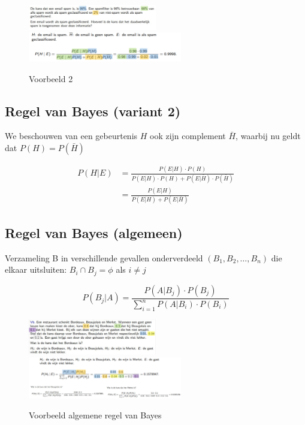 \documentclass{article}
\begin{document}
\begin{figure}[H]
    \centering
    \includegraphics[width=0.5\textwidth]{bayes-variant-voorbeeld2.png}
    \includegraphics[width=0.6\textwidth]{bayes-variant-voorbeeld2-opl.png}
    \caption{Voorbeeld 2}
\end{figure}

\subsection{Regel van Bayes (variant 2)}

We beschouwen van een gebeurtenis $H$ ook zijn complement $\bar{H}$, 
waarbij nu geldt dat $P(H) = P(\bar{H})$


\begin{equation}
    \begin{aligned}
        P(H | E) & = \frac{P(E | H) \cdot P(H)}{P(E | H) \cdot P(H) + P(E | \bar{H}) \cdot P(\bar{H})}\\
        & = \frac{P(E | H)}{P(E | H) + P(E | \bar{H})}
    \end{aligned}
\end{equation}

\subsection{Regel van Bayes (algemeen)}

Verzameling B in verschillende gevallen onderverdeeld $(B_1, B_2, \dots, B_n)$ die elkaar
uitsluiten: $B_i \cap B_j = \phi$ als $i \neq j$

\begin{equation}
    P(B_j | A) = \frac{P(A | B_j) \cdot P(B_j)}{\sum_{i=1}^n P(A|B_i) \cdot P(B_i)}
\end{equation}

\begin{figure}[H]
    \centering
    \includegraphics[width=0.5\textwidth]{bayes-algemeen-voorbeeld1.png}
    \includegraphics[width=0.6\textwidth]{bayes-algemeen-voorbeeld1-opl.png}
    \caption{Voorbeeld algemene regel van Bayes}
\end{figure}
\end{document}
